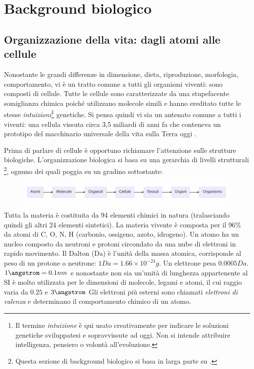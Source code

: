 \clearpage

\section{Background biologico}
\subsection{Organizzazione della vita: dagli atomi alle cellule}
Nonostante le grandi differenze in dimensione, dieta, riproduzione, morfologia, comportamento, vi è un tratto comune a tutti gli organismi viventi: sono composti di cellule. Tutte le cellule sono caratterizzate da una stupefacente somiglianza chimica poiché utilizzano molecole simili e hanno ereditato tutte le stesse \textit{intuizioni}\footnote{Il termine \textit{intuizione} è qui usato creativamente per indicare le soluzioni genetiche sviluppatesi e sopravvissute ad oggi. Non si intende attribuire intelligenza, pensiero o volontà all'evoluzione.} genetiche. Si pensa quindi vi sia un antenato comune a tutti i viventi: una cellula vissuta circa 3,5 miliardi di anni fa che conteneva un prototipo del macchinario universale della vita sulla Terra oggi \supercite{alberts2018essential}. \\

\par Prima di parlare di cellule è opportuno richiamare l'attenzione sulle strutture biologiche. L'organizzazione biologica si basa su una gerarchia di livelli strutturali \footnote{Questa sezione di background biologico si basa in larga parte su .}, ognuno dei quali poggia su un gradino sottostante: 

\begin{figure}[h]
	\centering
	\includegraphics[scale=0.45] {images/strutture_biologiche.png}
\end{figure}


\par Tutta la materia è costituita da 94 elementi chimici in natura\supercite{elementiNaturaWiki} (tralasciando quindi gli altri 24 elementi sintetici). La materia vivente è composta per il 96\% da atomi di C, O, N, H (carbonio, ossigeno, azoto, idrogeno). Un atomo ha un nucleo composto da neutroni e protoni circondato da una nube di elettroni in rapido movimento. Il Dalton (Da) è l'unità della massa atomica, corrisponde al peso di un protone o neutrone: $1 Da = 1.66 \times 10^{-24}g$. Un elettrone pesa $0.0005 Da$. $1 \angstrom = 0.1nm$ e nonostante non sia un'unità di lunghezza appartenente al SI è molto utilizzata per le dimensioni di molecole, legami e atomi, il cui raggio varia da $0.25$ e $3 \angstrom$
Gli elettroni più esterni sono chiamati \textit{elettroni di valenza} e determinano il comportamento chimico di un atomo.

